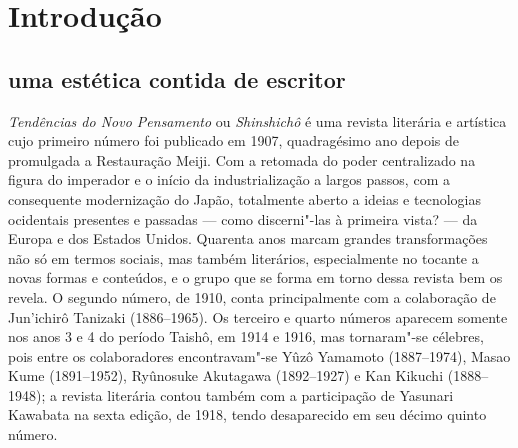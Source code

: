 \pagestyle{plain}

\chapter*{Introdução\smallskip{}}

\section*{uma estética contida de escritor}

\textit{Tendências do Novo Pensamento} ou \textit{Shinshichô} é uma
revista literária e artística cujo primeiro número foi publicado em
1907, quadragésimo ano depois de promulgada a Restauração Meiji. Com a
retomada do poder centralizado na figura do imperador e o início da
industrialização a largos passos, com a consequente modernização do
Japão, totalmente aberto a ideias e tecnologias ocidentais presentes e
passadas --- como discerni"-las à primeira vista? --- da Europa e dos
Estados Unidos. Quarenta anos marcam grandes transformações não só em
termos sociais, mas também literários, especialmente no tocante a novas
formas e conteúdos, e o grupo que se forma em torno dessa revista bem
os revela. O segundo número, de 1910, conta principalmente com a
colaboração de Jun'ichirô Tanizaki (1886--1965). Os terceiro e quarto
números aparecem somente nos anos 3 e 4 do período Taishô, em 1914 e
1916, mas tornaram"-se célebres, pois entre os
colaboradores encontravam"-se Yûzô Yamamoto  (1887--1974), Masao Kume 
(1891--1952), Ryûnosuke Akutagawa  (1892--1927) e Kan Kikuchi 
(1888--1948); a revista literária contou também com a participação de
Yasunari Kawabata  na sexta edição, de 1918, tendo desaparecido em seu
décimo quinto número.

